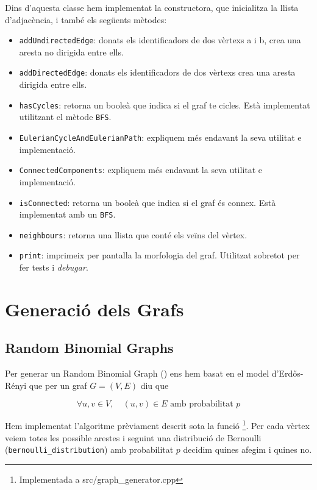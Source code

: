 Dins d'aquesta classe hem implementat la constructora, que inicialitza la llista d'adjacència, i també els següents mètodes:
\begin{itemize}
    \item\texttt{addUndirectedEdge}: donats els identificadors de dos vèrtexs a i b, crea una aresta no dirigida entre ells.
    \item\texttt{addDirectedEdge}: donats els identificadors de dos vèrtexs crea una aresta dirigida entre ells.
    \item\texttt{hasCycles}: retorna un booleà que indica si el graf te cicles. Està implementat utilitzant el mètode \texttt{BFS}.
    \item\texttt{EulerianCycleAndEulerianPath}: expliquem més endavant la seva utilitat e implementació.
    \item\texttt{ConnectedComponents}: expliquem més endavant la seva utilitat e implementació.
    \item\texttt{isConnected}: retorna un booleà que indica si el graf és connex. Està implementat amb un \texttt{BFS}.
    \item\texttt{neighbours}: retorna una llista que conté els veïns del vèrtex.
    \item\texttt{print}: imprimeix per pantalla la morfologia del graf. Utilitzat sobretot per fer tests i \textit{debugar}.
\end{itemize}


\section{Generació dels Grafs}
\subsection{Random Binomial Graphs}
Per generar un Random Binomial Graph (\BRG) ens hem basat en el model d'Erdős-Rényi \cite{Erdos1960OnGraphs,Erdos1959OnI} que per un graf $G=(V,E)$ diu que

\begin{equation}\label{eq:erdos}
    \forall u,v \in V,\quad (u,v) \in E \text{ amb probabilitat } p
\end{equation}

Hem implementat l'algoritme prèviament descrit sota la funció \BRG\footnote{Implementada a src/graph\_generator.cpp}. Per cada vèrtex veiem totes les possible arestes i seguint una distribució de Bernoulli (\texttt{bernoulli\_distribution}\cite{Bernoulli_distributionReference}) amb probabilitat $p$ decidim quines afegim i quines no.

